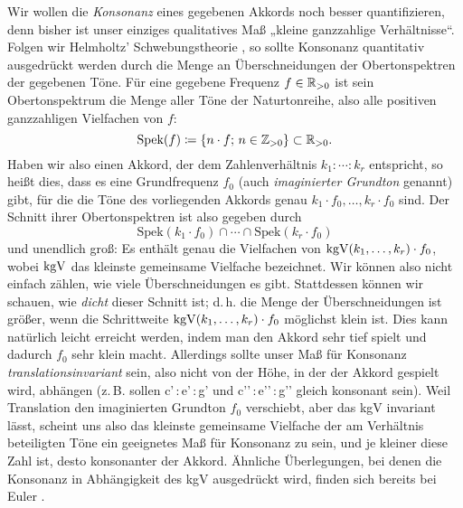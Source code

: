 Wir wollen die \emph{Konsonanz} eines gegebenen Akkords noch besser
quantifizieren, denn bisher ist unser einziges qualitatives Maß „kleine
ganzzahlige Verhältnisse“. Folgen wir Helmholtz’ Schwebungstheorie
\cite[§\,10–12]{HE}, so sollte Konsonanz quantitativ ausgedrückt werden durch die
Menge an Überschneidungen der Obertonspektren der gegebenen Töne. Für eine
gegebene Frequenz $f\in\mathbb{R}_{>0}$ ist sein Obertonspektrum die Menge aller Töne der
Naturtonreihe, also alle positiven ganzzahligen Vielfachen von $f$:
\[\mathrm{Spek}(f) \coloneqq \{n\cdot f;\,n\in\mathbb{Z}_{>0}\}\subset \mathbb{R}_{>0}.\]
Haben wir also einen Akkord, der dem Zahlenverhältnis $k_1:\dotsb:k_r$
entspricht, so heißt dies, dass es eine Grundfrequenz $f_0$ (auch
\emph{imaginierter Grundton} genannt) gibt, für die die Töne des vorliegenden
Akkords genau $k_1\cdot f_0,\dotsc,k_r\cdot f_0$ sind. Der Schnitt ihrer
Obertonspektren ist also gegeben durch
\[{\text{Spek}(k_1\cdot f_0)}\cap\dotsb\cap{\text{Spek}(k_r\cdot f_0)}\]%
und unendlich groß: Es enthält genau die Vielfachen von
$\mathrm{kgV}(k_1,\dotsc,k_r)\cdot f_0$, wobei $\mathrm{kgV}$ das kleinste gemeinsame
Vielfache bezeichnet. Wir können also nicht einfach zählen, wie viele
Überschneidungen es gibt. Stattdessen können wir schauen, wie \emph{dicht}
dieser Schnitt ist; d.\,h. die Menge der Überschneidungen ist größer, wenn die
Schrittweite $\mathrm{kgV}(k_1,\dotsc,k_r)\cdot f_0$ möglichst klein ist.  Dies kann
natürlich leicht erreicht werden, indem man den Akkord sehr tief spielt und
dadurch $f_0$ sehr klein macht. Allerdings sollte unser Maß für Konsonanz
\emph{translationsinvariant} sein, also nicht von der Höhe, in der der Akkord
gespielt wird, abhängen (z.\,B. sollen c’\,:\,\naturalm e’\,:\,g’ und
c’’\,:\,\naturalm e’’\,:\,g’’ gleich konsonant sein). Weil Translation den
imaginierten Grundton $f_0$ verschiebt, aber das kgV invariant lässt, scheint
uns also das kleinste gemeinsame Vielfache der am Verhältnis beteiligten Töne
ein geeignetes Maß für Konsonanz zu sein, und je kleiner diese Zahl ist, desto
konsonanter der Akkord. Ähnliche Überlegungen, bei denen die Konsonanz in
Abhängigkeit des kgV ausgedrückt wird, finden sich bereits bei Euler
\cite{Euler}.

